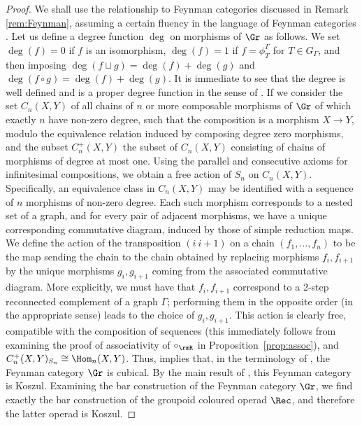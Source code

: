 \begin{proof}
We shall use the relationship to Feynman categories discussed in Remark \ref{rem:Feynman}, assuming a certain fluency in the language of Feynman categories \cite{MR3636409}. Let us define a degree function $\deg$ on morphisms of $\Gr$ as follows. We set $\deg(f)=0$ if $f$ is an isomorphism, $\deg(f)=1$ if $f=\phi^\Gamma_T$ for $T\in G_\Gamma$, and then imposing
$\deg(f\sqcup g)=\deg(f)+ \deg(g)$
and
$\deg(f\circ g)=\deg(f)+\deg(g)$. 
It is immediate to see that the degree is well defined and is a proper degree function in the sense of \cite[Def.~7.2.1]{MR3636409}. If we consider the set $C_n(X,Y)$ of all chains of $n$ or more composable morphisms of $\Gr$ of which exactly $n$ have non-zero degree, such that the composition is a morphism $X\to Y$, modulo the equivalence relation induced by composing degree zero morphisms, and the subset $C^+_n(X,Y)$ the subset of $C_n(X,Y)$ consisting of chains of morphisms of degree at most one. Using the parallel and consecutive axioms for infinitesimal compositions, we obtain a free action of $S_n$ on $C_n(X,Y)$. Specifically, an equivalence class in $C_n(X,Y)$ may be identified with a sequence of $n$ morphisms of non-zero degree. Each such morphism corresponds to a nested set of a graph, and for every pair of adjacent morphisms, we have a unique corresponding commutative diagram, induced by those of simple reduction maps. We define the action of the transposition $(i\ i+1)$ on a chain $(f_1,\ldots,f_n)$ to be the map sending the chain to the chain obtained by replacing morphisms  $f_i,f_{i+1}$ by the unique morphisms $g_i,g_{i+1}$ coming from the associated commutative diagram. More explicitly, we must have that $f_i,f_{i+1}$ correspond to a 2-step reconnected complement of a graph $\Gamma$; performing them in the opposite order (in the appropriate sense) leads to the choice of $g_i,g_{i+1}$. This action is clearly free, compatible with the composition of sequences (this immediately follows from examining the proof of associativity of $\circ_{\rmR}$ in Proposition~\ref{prop:assoc}), and $C^+_n(X,Y)_{S_n}\cong \Hom_n(X,Y)$. Thus, implies that, in the terminology of \cite[Def.~7.2.2]{MR3636409}, the Feynman category $\Gr$ is cubical. By the main result of \cite{KWKoszul}, this Feynman category is Koszul. Examining the bar construction of the Feynman category $\Gr$, we find exactly the bar construction of the groupoid coloured operad $\Rec$, and therefore the latter operad is Koszul.   
\end{proof}

